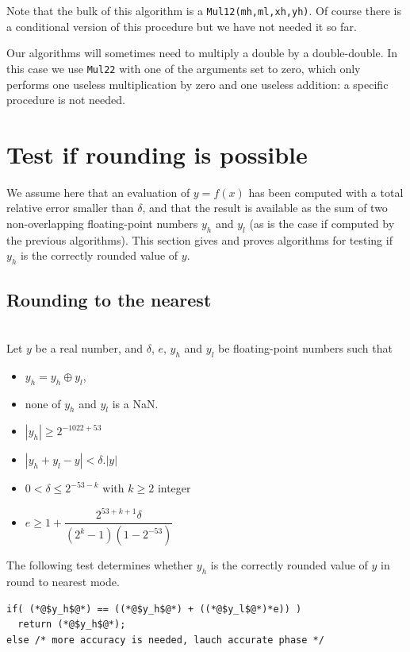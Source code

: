Note that the bulk of this algorithm is a \texttt{Mul12(mh,ml,xh,yh)}.
Of course there is a conditional version of this procedure but we have not needed it so far.

Our algorithms will sometimes need to multiply a double by a
double-double. In this case we use \texttt{Mul22} with one of the
arguments set to zero, which only performs one useless multiplication
by zero and one useless addition: a specific procedure is not needed.




\section{Test if rounding is possible\label{section:testrounding}}

We assume here that an evaluation of $y=f(x)$ has been computed with a
total relative error smaller than $\delta$, and that the result is
available as the sum of two non-overlapping floating-point numbers
$y_h$ and $y_l$ (as is the case if computed by the previous
algorithms). This section gives and proves algorithms for testing if
$y_h$ is the correctly rounded value of $y$.




\subsection{Rounding to the nearest}

\begin{theorem}
\label{th:roundingRN1}
~\\
Let $y$ be a real number, and  $\delta$, $e$, $y_h$ and $y_l$ be
  floating-point numbers such that 
  \begin{itemize}
  \item $y_h=y_h\oplus y_l$,
  \item none of $y_h$ and $y_l$ is a  NaN.
  \item $|y_h|\ge 2^{-1022+53}$ 
  \item $|y_h+y_l - y| < \delta.|y|$
  \item $0< \delta \le 2^{-53-k}$ with $k\ge 2$ integer
  \item $e\ge 1+  \dfrac{2^{53+k+1}\delta}{(2^{k}-1)(1-2^{-53})}$
\end{itemize}

The following test determines whether $y_h$ is the
  correctly rounded value of $y$ in  round to nearest mode.

\begin{lstlisting}[caption={Test for rounding to the nearest},
  firstnumber=1]
if( (*@$y_h$@*) == ((*@$y_h$@*) + ((*@$y_l$@*)*e)) )
  return (*@$y_h$@*);
else /* more accuracy is needed, lauch accurate phase */
\end{lstlisting}
\end{theorem}

